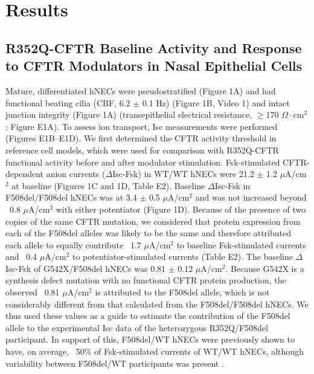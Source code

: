 \section{Results}
\subsection{R352Q-CFTR Baseline Activity and Response to CFTR Modulators in Nasal Epithelial Cells}
Mature, differentiated hNECs were pseudostratified (Figure 1A) and had functional beating cilia (CBF, 6.2 $\pm$ 0.1 Hz) (Figure 1B, Video 1) and intact junction integrity (Figure 1A) (transepithelial electrical resistance, $\geq$170 $\Omega\cdot$cm$^2$; Figure E1A). To assess ion transport, Isc measurements were performed (Figures E1B–E1D). We first determined the CFTR activity threshold in reference cell models, which were used for comparison with R352Q-CFTR functional activity before and after modulator stimulation. Fsk-stimulated CFTR-dependent anion currents ($\Delta$Isc-Fsk) in WT/WT hNECs were 21.2 $\pm$ 1.2 $\mu$A/cm$^2$ at baseline (Figures 1C and 1D, Table E2). Baseline $\Delta$Isc-Fsk in F508del/F508del hNECs was at 3.4 $\pm$ 0.5 $\mu$A/cm$^2$ and was not increased beyond ~0.8 $\mu$A/cm$^2$ with either potentiator (Figure 1D). Because of the presence of two copies of the same CFTR mutation, we considered that protein expression from each of the F508del alleles was likely to be the same and therefore attributed each allele to equally contribute ~1.7 $\mu$A/cm$^2$ to baseline Fsk-stimulated currents and ~0.4 $\mu$A/cm$^2$ to potentiator-stimulated currents (Table E2). The baseline $\Delta$Isc-Fsk of G542X/F508del hNECs was 0.81 $\pm$ 0.12 $\mu$A/cm$^2$. Because G542X is a synthesis defect mutation with no functional CFTR protein production, the observed ~0.81 $\mu$A/cm$^2$ is attributed to the F508del allele, which is not considerably different from that calculated from the F508del/F508del hNECs. We thus used these values as a guide to estimate the contribution of the F508del allele to the experimental Isc data of the heterozygous R352Q/F508del participant. In support of this, F508del/WT hNECs were previously shown to have, on average, ~50\% of Fsk-stimulated currents of WT/WT hNECs, although variability between F508del/WT participants was present \cite{pranke2017}.

